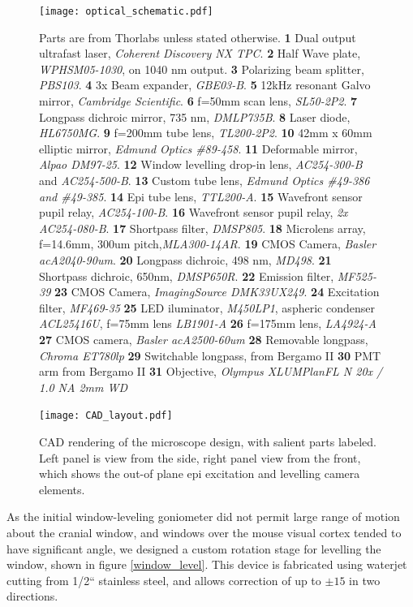 \documentclass[a4paper,12pt]{article}
\begin{document}
\begin{figure}
\label{optical_schematic}
\centering
\texttt{[image: optical\_schematic.pdf]}
\caption{ Parts are from Thorlabs unless stated otherwise. 
\textbf{1} Dual output ultrafast laser, \textsl{Coherent Discovery NX TPC}. 
\textbf{2} Half Wave plate, \textsl{WPHSM05-1030}, on 1040 nm output. 
\textbf{3} Polarizing beam splitter, \textsl{PBS103}.
\textbf{4} 3x Beam expander, \textsl{GBE03-B}.
\textbf{5} 12kHz resonant Galvo mirror, \textsl{Cambridge Scientific}.
\textbf{6} f=50mm scan lens, \textsl{SL50-2P2}.
\textbf{7} Longpass dichroic mirror, 735 nm, \textsl{DMLP735B}.
\textbf{8} Laser diode, \textsl{HL6750MG}.
\textbf{9} f=200mm tube lens, \textsl{TL200-2P2}.
\textbf{10} 42mm x 60mm elliptic mirror, \textsl{Edmund Optics \#89-458}.
\textbf{11} Deformable mirror, \textsl{Alpao DM97-25}.
\textbf{12} Window levelling drop-in lens, \textsl{AC254-300-B} and \textsl{AC254-500-B}.
\textbf{13} Custom tube lens, \textsl{Edmund Optics \#49-386 and \#49-385}.
\textbf{14} Epi tube lens, \textsl{ TTL200-A}.
\textbf{15} Wavefront sensor pupil relay, \textsl{AC254-100-B}.
\textbf{16} Wavefront sensor pupil relay, \textsl{2x AC254-080-B}.
\textbf{17} Shortpass filter, \textsl{DMSP805}.
\textbf{18} Microlens array, f=14.6mm, 300um pitch,\textsl{MLA300-14AR}.
\textbf{19} CMOS Camera, \textsl{Basler acA2040-90um}.
\textbf{20} Longpass dichroic, 498 nm, \textsl{MD498}.
\textbf{21} Shortpass dichroic, 650nm, \textsl{DMSP650R}.
\textbf{22} Emission filter, \textsl{MF525-39}
\textbf{23} CMOS Camera, \textsl{ImagingSource DMK33UX249}.
\textbf{24} Excitation filter, \textsl{MF469-35}
\textbf{25} LED iluminator, \textsl{M450LP1}, aspheric condenser \textsl{ACL25416U}, f=75mm lens \textsl{LB1901-A}
\textbf{26} f=175mm lens, \textsl{LA4924-A}
\textbf{27} CMOS camera, \textsl{Basler acA2500-60um}
\textbf{28} Removable longpass, \textsl{Chroma ET780lp}
\textbf{29} Switchable longpass, from Bergamo II
\textbf{30} PMT arm from Bergamo II
\textbf{31} Objective, \textsl{Olympus XLUMPlanFL N 20x / 1.0 NA 2mm WD} 
}
\end{figure}

\begin{figure}
\label{CAD_layout}
\centering
\texttt{[image: CAD\_layout.pdf]}
\caption{CAD rendering of the microscope design, with salient parts labeled.  Left panel is view from the side, right panel view from the front, which shows the out-of plane epi excitation and levelling camera elements.  }
\end{figure}


As the initial window-leveling goniometer did not permit large range of motion about the cranial window, and windows over the mouse visual cortex tended to have significant angle, we designed a custom rotation stage for levelling the window, shown in figure \ref{window_level}.  This device is fabricated using waterjet cutting from 1/2`` stainless steel, and allows correction of up to $\pm 15$ in two directions.
\end{document}

